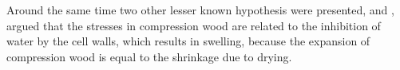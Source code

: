 Around the same time two other lesser known hypothesis were presented, \cite{hejnowicz1967some} and \cite{brodzki1972}, argued that the stresses in compression
wood are related to the inhibition of water by the cell walls, which results in
swelling, because the expansion of compression wood is equal to the shrinkage
due to drying.